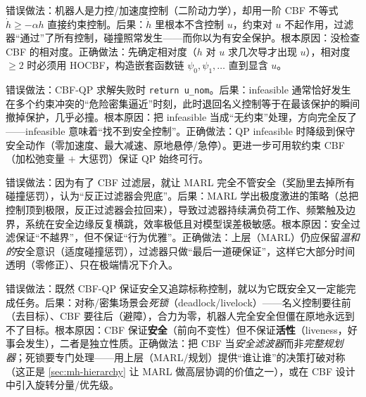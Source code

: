 \begin{pitfall}
错误做法：机器人是力控/加速度控制（二阶动力学），却用一阶 CBF 不等式 $\dot h\ge-\alpha h$ 直接约束控制。后果：$\dot h$ 里根本不含控制 $u$，约束对 $u$ 不起作用，过滤器“通过”了所有控制，碰撞照常发生——而你以为有安全保护。根本原因：没检查 CBF 的相对度。正确做法：先确定相对度（$h$ 对 $u$ 求几次导才出现 $u$），相对度 $\ge2$ 时必须用 HOCBF，构造嵌套函数链 $\psi_0,\psi_1,\dots$ 直到显含 $u$。
\end{pitfall}

\begin{pitfall}
错误做法：CBF-QP 求解失败时 \texttt{return u\_nom}。后果：infeasible 通常恰好发生在多个约束冲突的“危险密集逼近”时刻，此时退回名义控制等于在最该保护的瞬间撤掉保护，几乎必撞。根本原因：把 infeasible 当成“无约束”处理，方向完全反了——infeasible 意味着“找不到安全控制”。正确做法：QP infeasible 时降级到保守安全动作（零加速度、最大减速、原地悬停/急停）。更进一步可用软约束 CBF（加松弛变量 $+$ 大惩罚）保证 QP 始终可行。
\end{pitfall}

\begin{pitfall}
错误做法：因为有了 CBF 过滤层，就让 MARL 完全不管安全（奖励里去掉所有碰撞惩罚），认为“反正过滤器会兜底”。后果：MARL 学出极度激进的策略（总把控制顶到极限，反正过滤器会拉回来），导致过滤器持续满负荷工作、频繁触及边界，系统在安全边缘反复横跳，效率极低且对模型误差极敏感。根本原因：安全过滤保证“不越界”，但不保证“行为优雅”。正确做法：上层（MARL）仍应保留\emph{温和的}安全意识（适度碰撞惩罚），过滤器只做“最后一道硬保证”，这样它大部分时间透明（零修正）、只在极端情况下介入。
\end{pitfall}

\begin{pitfall}
错误做法：既然 CBF-QP 保证安全又追踪标称控制，就以为它既安全又一定能完成任务。后果：对称/密集场景会\emph{死锁}（deadlock/livelock）——名义控制要往前（去目标）、CBF 要往后（避障），合力为零，机器人完全安全但僵在原地永远到不了目标。根本原因：CBF 保证\textbf{安全}（前向不变性）但不保证\textbf{活性}（liveness，好事会发生），二者是独立性质。正确做法：把 CBF 当\emph{安全滤波器}而非\emph{完整规划器}；死锁要专门处理——用上层（MARL/规划）提供“谁让谁”的决策打破对称（这正是 \cref{sec:mh-hierarchy} 让 MARL 做高层协调的价值之一），或在 CBF 设计中引入旋转分量/优先级。
\end{pitfall}


